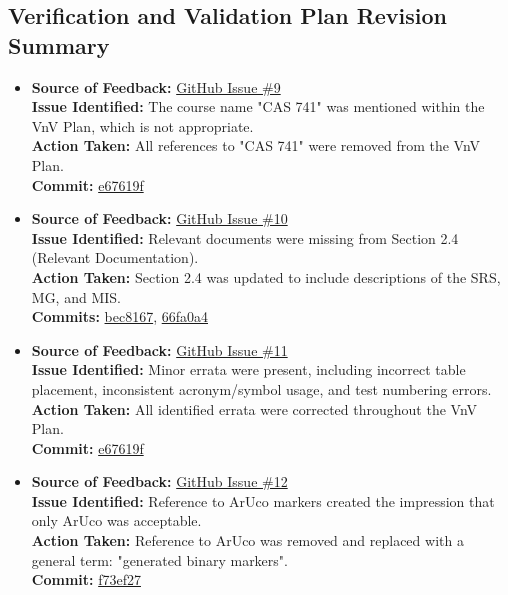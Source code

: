 \documentclass{article}
\begin{document}
\subsection*{Verification and Validation Plan Revision Summary}
\begin{itemize}

  \item \textbf{Source of Feedback:} \href{https://github.com/KiranSingh15/CAS-741-Image-Correspondences/issues/9}{GitHub Issue \#9} \\
  \textbf{Issue Identified:} The course name "CAS 741" was mentioned within the VnV Plan, which is not appropriate. \\
  \textbf{Action Taken:} All references to "CAS 741" were removed from the VnV Plan. \\
  \textbf{Commit:} \href{https://github.com/KiranSingh15/CAS-741-Image-Correspondences/commit/e67619f822163a70f87b6734e7c6d5f9f51dd864}{e67619f}

  \item \textbf{Source of Feedback:} \href{https://github.com/KiranSingh15/CAS-741-Image-Correspondences/issues/10}{GitHub Issue \#10} \\
  \textbf{Issue Identified:} Relevant documents were missing from Section 2.4 (Relevant Documentation). \\
  \textbf{Action Taken:} Section 2.4 was updated to include descriptions of the SRS, MG, and MIS. \\
  \textbf{Commits:} 
  \href{https://github.com/KiranSingh15/CAS-741-Image-Correspondences/commit/bec8167599e374f06193fd96d8b9e88414cd9e9a}{bec8167}, 
  \href{https://github.com/KiranSingh15/CAS-741-Image-Correspondences/commit/66fa0a4d2f9a725465743354ba8c35d4d53baa98}{66fa0a4}

  \item \textbf{Source of Feedback:} \href{https://github.com/KiranSingh15/CAS-741-Image-Correspondences/issues/11}{GitHub Issue \#11} \\
  \textbf{Issue Identified:} Minor errata were present, including incorrect table placement, inconsistent acronym/symbol usage, and test numbering errors. \\
  \textbf{Action Taken:} All identified errata were corrected throughout the VnV Plan. \\
  \textbf{Commit:} \href{https://github.com/KiranSingh15/CAS-741-Image-Correspondences/commit/e67619f822163a70f87b6734e7c6d5f9f51dd864}{e67619f}

  \item \textbf{Source of Feedback:} \href{https://github.com/KiranSingh15/CAS-741-Image-Correspondences/issues/12}{GitHub Issue \#12} \\
  \textbf{Issue Identified:} Reference to ArUco markers created the impression that only ArUco was acceptable. \\
  \textbf{Action Taken:} Reference to ArUco was removed and replaced with a general term: "generated binary markers". \\
  \textbf{Commit:} \href{https://github.com/KiranSingh15/CAS-741-Image-Correspondences/commit/f73ef273ec0e440c47bb849f142982482d895bc0}{f73ef27}


\end{itemize}
\end{document}
